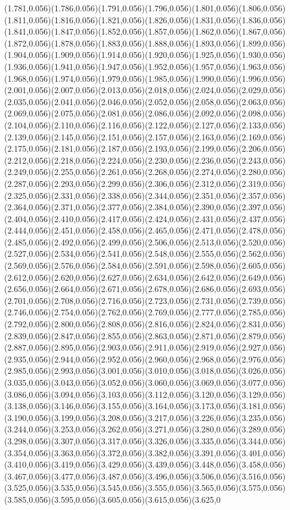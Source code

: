 \documentclass[smallextended]{svjour3}
\begin{document}
(1.781,0.056)(1.786,0.056)(1.791,0.056)(1.796,0.056)(1.801,0.056)(1.806,0.056)(1.811,0.056)(1.816,0.056)(1.821,0.056)(1.826,0.056)(1.831,0.056)(1.836,0.056)(1.841,0.056)(1.847,0.056)(1.852,0.056)(1.857,0.056)(1.862,0.056)(1.867,0.056)(1.872,0.056)(1.878,0.056)(1.883,0.056)(1.888,0.056)(1.893,0.056)(1.899,0.056)(1.904,0.056)(1.909,0.056)(1.914,0.056)(1.920,0.056)(1.925,0.056)(1.930,0.056)(1.936,0.056)(1.941,0.056)(1.947,0.056)(1.952,0.056)(1.957,0.056)(1.963,0.056)(1.968,0.056)(1.974,0.056)(1.979,0.056)(1.985,0.056)(1.990,0.056)(1.996,0.056)(2.001,0.056)(2.007,0.056)(2.013,0.056)(2.018,0.056)(2.024,0.056)(2.029,0.056)(2.035,0.056)(2.041,0.056)(2.046,0.056)(2.052,0.056)(2.058,0.056)(2.063,0.056)(2.069,0.056)(2.075,0.056)(2.081,0.056)(2.086,0.056)(2.092,0.056)(2.098,0.056)(2.104,0.056)(2.110,0.056)(2.116,0.056)(2.122,0.056)(2.127,0.056)(2.133,0.056)(2.139,0.056)(2.145,0.056)(2.151,0.056)(2.157,0.056)(2.163,0.056)(2.169,0.056)(2.175,0.056)(2.181,0.056)(2.187,0.056)(2.193,0.056)(2.199,0.056)(2.206,0.056)(2.212,0.056)(2.218,0.056)(2.224,0.056)(2.230,0.056)(2.236,0.056)(2.243,0.056)(2.249,0.056)(2.255,0.056)(2.261,0.056)(2.268,0.056)(2.274,0.056)(2.280,0.056)(2.287,0.056)(2.293,0.056)(2.299,0.056)(2.306,0.056)(2.312,0.056)(2.319,0.056)(2.325,0.056)(2.331,0.056)(2.338,0.056)(2.344,0.056)(2.351,0.056)(2.357,0.056)(2.364,0.056)(2.371,0.056)(2.377,0.056)(2.384,0.056)(2.390,0.056)(2.397,0.056)(2.404,0.056)(2.410,0.056)(2.417,0.056)(2.424,0.056)(2.431,0.056)(2.437,0.056)(2.444,0.056)(2.451,0.056)(2.458,0.056)(2.465,0.056)(2.471,0.056)(2.478,0.056)(2.485,0.056)(2.492,0.056)(2.499,0.056)(2.506,0.056)(2.513,0.056)(2.520,0.056)(2.527,0.056)(2.534,0.056)(2.541,0.056)(2.548,0.056)(2.555,0.056)(2.562,0.056)(2.569,0.056)(2.576,0.056)(2.584,0.056)(2.591,0.056)(2.598,0.056)(2.605,0.056)(2.612,0.056)(2.620,0.056)(2.627,0.056)(2.634,0.056)(2.642,0.056)(2.649,0.056)(2.656,0.056)(2.664,0.056)(2.671,0.056)(2.678,0.056)(2.686,0.056)(2.693,0.056)(2.701,0.056)(2.708,0.056)(2.716,0.056)(2.723,0.056)(2.731,0.056)(2.739,0.056)(2.746,0.056)(2.754,0.056)(2.762,0.056)(2.769,0.056)(2.777,0.056)(2.785,0.056)(2.792,0.056)(2.800,0.056)(2.808,0.056)(2.816,0.056)(2.824,0.056)(2.831,0.056)(2.839,0.056)(2.847,0.056)(2.855,0.056)(2.863,0.056)(2.871,0.056)(2.879,0.056)(2.887,0.056)(2.895,0.056)(2.903,0.056)(2.911,0.056)(2.919,0.056)(2.927,0.056)(2.935,0.056)(2.944,0.056)(2.952,0.056)(2.960,0.056)(2.968,0.056)(2.976,0.056)(2.985,0.056)(2.993,0.056)(3.001,0.056)(3.010,0.056)(3.018,0.056)(3.026,0.056)(3.035,0.056)(3.043,0.056)(3.052,0.056)(3.060,0.056)(3.069,0.056)(3.077,0.056)(3.086,0.056)(3.094,0.056)(3.103,0.056)(3.112,0.056)(3.120,0.056)(3.129,0.056)(3.138,0.056)(3.146,0.056)(3.155,0.056)(3.164,0.056)(3.173,0.056)(3.181,0.056)(3.190,0.056)(3.199,0.056)(3.208,0.056)(3.217,0.056)(3.226,0.056)(3.235,0.056)(3.244,0.056)(3.253,0.056)(3.262,0.056)(3.271,0.056)(3.280,0.056)(3.289,0.056)(3.298,0.056)(3.307,0.056)(3.317,0.056)(3.326,0.056)(3.335,0.056)(3.344,0.056)(3.354,0.056)(3.363,0.056)(3.372,0.056)(3.382,0.056)(3.391,0.056)(3.401,0.056)(3.410,0.056)(3.419,0.056)(3.429,0.056)(3.439,0.056)(3.448,0.056)(3.458,0.056)(3.467,0.056)(3.477,0.056)(3.487,0.056)(3.496,0.056)(3.506,0.056)(3.516,0.056)(3.525,0.056)(3.535,0.056)(3.545,0.056)(3.555,0.056)(3.565,0.056)(3.575,0.056)(3.585,0.056)(3.595,0.056)(3.605,0.056)(3.615,0.056)(3.625,0
\end{document}
